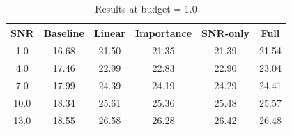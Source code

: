\begin{table}[h]
\centering
\caption{Results at budget = 1.0}
\begin{tabular}{c|ccccc}
\hline
SNR & Baseline & Linear & Importance & SNR-only & Full \\
\hline
1.0 & 16.68 & 21.50 & 21.35 & 21.39 & 21.54 \\
4.0 & 17.46 & 22.99 & 22.83 & 22.90 & 23.04 \\
7.0 & 17.99 & 24.39 & 24.19 & 24.29 & 24.41 \\
10.0 & 18.34 & 25.61 & 25.36 & 25.48 & 25.57 \\
13.0 & 18.55 & 26.58 & 26.28 & 26.42 & 26.48 \\
\hline
\end{tabular}
\end{table}

